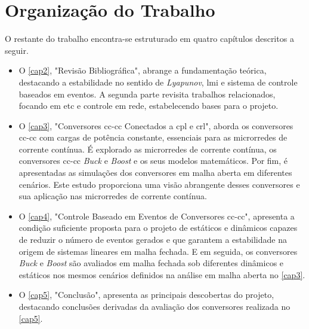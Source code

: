 \section{Organização do Trabalho}

O restante do trabalho encontra-se estruturado em quatro capítulos descritos a seguir.


\begin{itemize}
    \item O \autoref{cap2}, "Revisão Bibliográfica", abrange a fundamentação teórica, destacando a estabilidade no sentido de \textit{Lyapunov}, \acrfull{lmi} e sistema de controle baseados em eventos. A segunda parte revisita trabalhos relacionados, focando em \acrshort{etc} e controle em rede, estabelecendo bases para o projeto.
    \item O \autoref{cap3}, "Conversores \acrshort{cc}-\acrshort{cc} Conectados a \acrshort{cpl} e \acrshort{crl}", aborda os conversores \acrshort{cc}-\acrshort{cc} com cargas de potência constante, essenciais para as microrredes de corrente contínua. É explorado as microrredes de corrente contínua, os conversores \acrshort{cc}-\acrshort{cc} \textit{Buck} e \textit{Boost} e os seus modelos matemáticos. Por fim, é apresentadas as simulações dos conversores em malha aberta em diferentes cenários. Este estudo proporciona uma visão abrangente desses conversores e sua aplicação nas microrredes de corrente contínua.
    \item O \autoref{cap4}, "Controle Baseado em Eventos de Conversores \acrshort{cc}-\acrshort{cc}", apresenta a condição suficiente proposta para o projeto de  estáticos e dinâmicos capazes de reduzir o número de eventos gerados e que garantem a estabilidade na origem de sistemas lineares em malha fechada. E em seguida, os conversores \textit{Buck} e \textit{Boost} são avaliados em malha fechada sob diferentes  dinâmicos e estáticos nos mesmos cenários definidos na análise em malha aberta no \autoref{cap3}.  
    \item O \autoref{cap5}, "Conclusão", apresenta as principais descobertas do projeto, destacando conclusões derivadas da avaliação dos conversores realizada no \autoref{cap5}.
\end{itemize}



